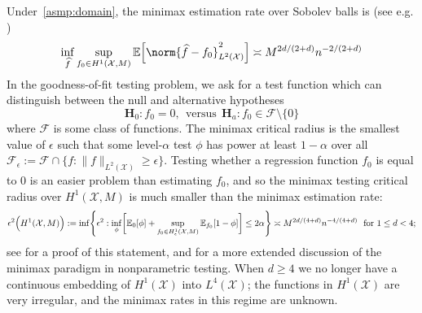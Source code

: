 \documentclass{article}
\newcommand{\1}{\mathbf{1}}
\newcommand{\Xset}{\mathcal{X}}
\newcommand{\Leb}{L}
\newcommand{\mc}[1]{\mathcal{#1}}
\newcommand{\Ebb}{\mathbb{E}}
\newcommand{\wh}[1]{\widehat{#1}}
\theoremstyle{alden}
\theoremstyle{aldenthm}
\theoremstyle{definition}
\theoremstyle{remark}
\begin{document}
Under~\ref{asmp:domain}, the minimax estimation rate over Sobolev balls is (see e.g. \citep{tsybakov2008_book})
\begin{equation}
\label{eqn:sobolev_space_estimation_minimax_rate}
\inf_{\wh{f}} \sup_{f_0 \in H^1(\Xset, M)} \Ebb\Bigl[\norm{\wh{f} - f_0}_{L^2(\Xset)}^2\Bigr] \asymp M^{2d/(2 + d)}n^{-2/(2 + d)}
\end{equation}
In the goodness-of-fit testing problem, we ask for a test function which can distinguish between the null and alternative hypotheses
\begin{equation}
\mathbf{H}_0: f_0 = 0, ~~\textrm{versus}~~ \mathbf{H}_a: f_0 \in \mc{F} \setminus \{0\}
\end{equation} 
where $\mc{F}$ is some class of functions. The minimax critical radius is the smallest value of $\epsilon$ such that some level-${\alpha}$ test $\phi$ has power at least $1 - \alpha$ over all $\mc{F}_{\epsilon} := \mc{F} \cap \{f: \|f\|_{\Leb^2(\Xset)} \geq \epsilon\}$. Testing whether a regression function $f_0$ is equal to $0$ is an easier problem than estimating $f_0$, and so the minimax testing critical radius over $H^1(\Xset,M)$ is much smaller than the minimax estimation rate:
\begin{equation}
\label{eqn:sobolev_space_testing_critical_radius}
\epsilon^2\Bigl(H^1(\Xset,M)\Bigr):= \inf\Biggl\{\epsilon^2: \inf_{\phi} \biggl[\Ebb_0[\phi] +  \sup_{f_0 \in H_{\epsilon}^1(\Xset,M)} \Ebb_{f_0}[1 - \phi]\biggr] \leq 2\alpha \Biggr\} \asymp M^{2d/(4 + d)}n^{-4/(4 + d)}~~\textrm{for $1 \leq d < 4$;}
\end{equation}
see \cite{ingster09} for a proof of this statement, and \cite{ariascastro2018} for a more extended discussion of the minimax paradigm in nonparametric testing. When $d \geq 4$ we no longer have a continuous embedding of $H^1(\Xset)$ into $\Leb^4(\Xset)$; the functions in $H^1(\Xset)$ are very irregular, and the minimax rates in this regime are unknown. 
\end{document}
